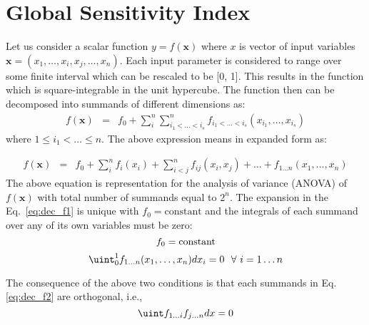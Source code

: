 \section{Global Sensitivity Index}
Let us consider a scalar function $ y= f(\mathbf{x})$  where $x$ is vector of input variables $\mathbf{x}=(x_1,\ldots,x_i,x_j, \ldots,x_n)$. Each input
parameter is considered to range over some finite interval which can be  rescaled to be [0, 1]. This results in the function which is square-integrable in the unit hypercube. The function then  can be decomposed into summands of different dimensions as: 
\begin{eqnarray}  
\label{eq:dec_f1}
  f(\mathbf{x})  & = & f_0 + \sum_i^n \sum_{i_{1}<\ldots<i_{s}}^n f_{i_{1}<\ldots<i_{s}}(x_{i_1},\ldots,x_{i_s})
\end{eqnarray}
where $ 1 \leq i_1<\ldots \leq n$. The above expression means in expanded form as:

\begin{eqnarray}  
\label{eq:dec_f21}
  f(\mathbf{x})  & = & f_0 + \sum_i^n f_i(x_i) + \sum_{i<j}^n f_{ij}(x_i,x_j) + \ldots + f_{1\ldots n}(x_1,\ldots,x_n)   
\end{eqnarray}
The above equation is representation for the analysis of variance (ANOVA) of $f(\mathbf{x})$ with total number of summands equal to $2^n$. The expansion in the Eq.~\ref{eq:dec_f1} is unique with $f_0=\text{constant}$ and the integrals of each summand over any of its own variables must be zero:
\begin{equation}
\label{eq:cond11}
 f_0 = \text{constant}\\
\end{equation}
\begin{equation}
\label{eq:cond21}
\displaystyle \uint_{0}^{1}  f_{1\ldots n}(x_1,\ldots,x_n) dx_i=0~~ \forall~i=1\ldots n
\end{equation}


The consequence of the above two conditions is that each summands in Eq.\ref{eq:dec_f2} are orthogonal, i.e.,
\begin{equation}
\label{eq:orth}
\displaystyle \uint f_{1\ldots i}f_{j\ldots n}dx = 0
\end{equation}

